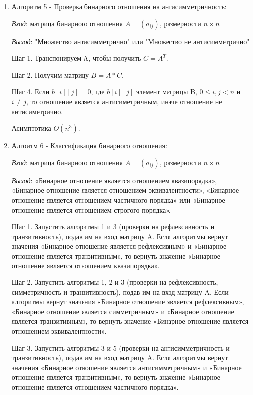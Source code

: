 \documentclass[spec, och, labwork]{shiza}
\begin{document}
\begin{enumerate}
                \item Алгоритм 5 - Проверка бинарного отношения на антисимметричность:
                
                \textit{Вход}: матрица бинарного отношения $A = (a_{ij})$, размерности $n \times n$

                \textit{Выход}: "Множество антисимметрично" или "Множество не антисимметрично"

                Шаг 1. Транспонируем A, чтобы получить $C = A^T$.

                Шаг 2. Получим матрицу $B = A * C$.

                Шаг 4. Если $b[i][j]  = 0$, где 
                $b[i][j]$ элемент матрицы B, $0 \leq i, j < n$ и $i \neq j$, то отношение является антисиметричным, иначе отношение не антисиметрично.

                Асимптотика $O(n^3)$.

                \item Алгоитм 6 - Классификация бинарного отношения:
                
                \textit{Вход}: матрица бинарного отношения $A = (a_{ij})$, размерности $n \times n$

                \textit{Выход}: «Бинарное отношение является отношением квазипорядка», «Бинарное отношение является отношением 
                эквивалентности», «Бинарное отношение является отношением частичного порядка» или «Бинарное отношение 
                является отношением строгого порядка».

                Шаг 1. Запустить алгоритмы 1 и 3 (проверки на рефлексивность и транзитивность), подав им на вход матрицу A. Если алгоритмы вернут значения «Бинарное отношение является рефлексивным» и «Бинарное отношение является транзитивным», то вернуть значение «Бинарное отношение является отношением квазипорядка».

                Шаг 2. Запустить алгоритмы 1, 2 и 3 (проверки на рефлексивность, симметричность и транзитивность), подав им на вход матрицу A. Если алгоритмы вернут значения «Бинарное отношение является рефлексивным», «Бинарное отношение является симметричным» и «Бинарное отношение является транзитивным», то вернуть значение «Бинарное отношение является отношением эквивалентности».

                Шаг 3. Запустить алгоритмы 3 и 5 (проверки на антисимметричность и транзитивность), подав им на вход матрицу A. Если алгоритмы вернут значения «Бинарное отношение является антисимметричным» и «Бинарное отношение является транзитивным», то вернуть значение «Бинарное отношение является отношением частичного порядка».


\end{enumerate}
\end{document}
